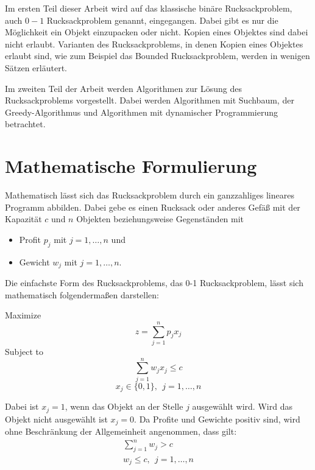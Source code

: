 Im ersten Teil dieser Arbeit wird auf das klassische binäre Rucksackproblem, auch $0-1$ Rucksackproblem genannt, eingegangen. 
Dabei gibt es nur die Möglichkeit ein Objekt einzupacken oder nicht. Kopien eines Objektes sind dabei nicht erlaubt. Varianten des Rucksackproblems, in denen Kopien eines Objektes erlaubt sind, wie zum Beispiel das Bounded Rucksackproblem, werden in wenigen Sätzen erläutert.


Im zweiten Teil der Arbeit werden Algorithmen zur Lösung des Rucksackproblems vorgestellt.
Dabei werden Algorithmen mit Suchbaum, der Greedy-Algorithmus und Algorithmen mit dynamischer Programmierung betrachtet.

\chapter{Mathematische Formulierung}
Mathematisch lässt sich das Rucksackproblem durch ein ganzzahliges lineares Programm abbilden.
Dabei gebe es einen Rucksack oder anderes Gefäß mit der Kapazität $c$ und $n$ Objekten beziehungsweise Gegenständen mit
\begin{itemize}
    \item Profit $p_j$ mit $j=1,\ldots,n$ und
    \item Gewicht $w_j$ mit $j=1,\ldots,n$.
\end{itemize}
Die einfachste Form des Rucksackproblems, das 0-1 Rucksackproblem, lässt sich mathematisch folgendermaßen darstellen: \cite[vgl.][]{Martello1987}

Maximize
\begin{equation}
z=\sum_{j=1}^{n}{p_jx_j} 
\end{equation}
Subject to 
\begin{equation} \label{eqn:subjectTo}
\sum_{j=1}^{n}{w_jx_j\le c}
\end{equation}
\begin{equation} \label{eqn:bedingung}
x_j\in\{0,1\},\ \ j=1,\ldots,n
\end{equation}

Dabei ist $x_j = 1$, wenn das Objekt an der Stelle $j$ ausgewählt wird. Wird das Objekt nicht ausgewählt ist $x_j = 0$. Da Profite und Gewichte positiv sind, wird ohne Beschränkung der Allgemeinheit angenommen, dass gilt: \cite[vgl.][]{Martello1987}
\begin{eqnarray}
\sum_{j=1}^{n}{w_j>c} \\
w_j\le c,\ \ j=1,\ldots,n
\end{eqnarray}


